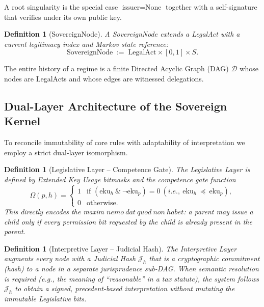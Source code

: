 \documentclass[11pt,a4paper]{article}
\newtheorem{definition}[theorem]{Definition}
\begin{document}
A root singularity is the special case \(\text{issuer} = \text{None}\) together with a self-signature that verifies under its own public key.

\begin{definition}[SovereignNode]
A \emph{SovereignNode} extends a LegalAct with a current legitimacy index and Markov state reference:
\[
\text{SovereignNode} \;:=\; \text{LegalAct} \times [0,1] \times S.
\]
\end{definition}

The entire history of a regime is a finite Directed Acyclic Graph (DAG) \(\mathcal{D}\) whose nodes are LegalActs and whose edges are witnessed delegations.

\subsection{Dual-Layer Architecture of the Sovereign Kernel}

To reconcile immutability of core rules with adaptability of interpretation we employ a strict dual-layer isomorphism.

\begin{definition}[Legislative Layer -- Competence Gate]
The Legislative Layer is defined by Extended Key Usage bitmasks and the competence gate function
\[
\Omega(p, h) = 
\begin{cases}
1 & \text{if } (\text{eku}_h\ \&\ \lnot\text{eku}_p) = 0\ (i.e.,\ \text{eku}_h\ \preceq\ \text{eku}_p), \\
0 & \text{otherwise}.
\end{cases}
\]
This directly encodes the maxim \(nemo\ dat\ quod\ non\ habet\): a parent may issue a child only if every permission bit requested by the child is already present in the parent.
\end{definition}

\begin{definition}[Interpretive Layer -- Judicial Hash]
The Interpretive Layer augments every node with a Judicial Hash \(\mathcal{J}_h\) that is a cryptographic commitment (hash) to a node in a separate jurisprudence sub-DAG. When semantic resolution is required (e.g., the meaning of ``reasonable'' in a tax statute), the system follows \(\mathcal{J}_h\) to obtain a signed, precedent-based interpretation without mutating the immutable Legislative bits.
\end{definition}
\end{document}
